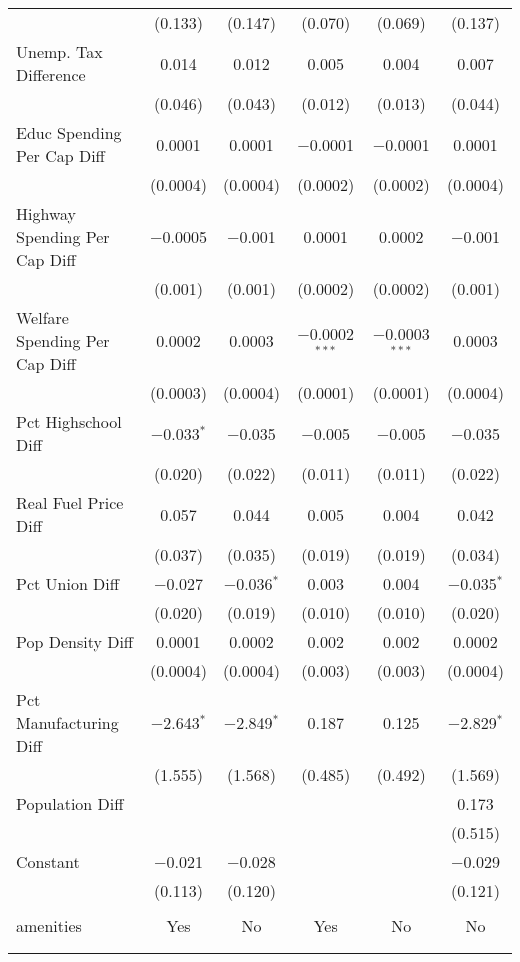 \begin{table}[!htbp]
\begin{tabular}{@{\extracolsep{5pt}}lccccc}
  & (0.133) & (0.147) & (0.070) & (0.069) & (0.137) \\ 
  Unemp. Tax Difference & 0.014 & 0.012 & 0.005 & 0.004 & 0.007 \\ 
  & (0.046) & (0.043) & (0.012) & (0.013) & (0.044) \\ 
  Educ Spending Per Cap Diff & 0.0001 & 0.0001 & $-$0.0001 & $-$0.0001 & 0.0001 \\ 
  & (0.0004) & (0.0004) & (0.0002) & (0.0002) & (0.0004) \\ 
  Highway Spending Per Cap Diff & $-$0.0005 & $-$0.001 & 0.0001 & 0.0002 & $-$0.001 \\ 
  & (0.001) & (0.001) & (0.0002) & (0.0002) & (0.001) \\ 
  Welfare Spending Per Cap Diff & 0.0002 & 0.0003 & $-$0.0002$^{***}$ & $-$0.0003$^{***}$ & 0.0003 \\ 
  & (0.0003) & (0.0004) & (0.0001) & (0.0001) & (0.0004) \\ 
  Pct Highschool Diff & $-$0.033$^{*}$ & $-$0.035 & $-$0.005 & $-$0.005 & $-$0.035 \\ 
  & (0.020) & (0.022) & (0.011) & (0.011) & (0.022) \\ 
  Real Fuel Price Diff & 0.057 & 0.044 & 0.005 & 0.004 & 0.042 \\ 
  & (0.037) & (0.035) & (0.019) & (0.019) & (0.034) \\ 
  Pct Union Diff & $-$0.027 & $-$0.036$^{*}$ & 0.003 & 0.004 & $-$0.035$^{*}$ \\ 
  & (0.020) & (0.019) & (0.010) & (0.010) & (0.020) \\ 
  Pop Density Diff & 0.0001 & 0.0002 & 0.002 & 0.002 & 0.0002 \\ 
  & (0.0004) & (0.0004) & (0.003) & (0.003) & (0.0004) \\ 
  Pct Manufacturing Diff & $-$2.643$^{*}$ & $-$2.849$^{*}$ & 0.187 & 0.125 & $-$2.829$^{*}$ \\ 
  & (1.555) & (1.568) & (0.485) & (0.492) & (1.569) \\ 
  Population Diff &  &  &  &  & 0.173 \\ 
  &  &  &  &  & (0.515) \\ 
  Constant & $-$0.021 & $-$0.028 &  &  & $-$0.029 \\ 
  & (0.113) & (0.120) &  &  & (0.121) \\ 
 \hline \\[-1.8ex] 
amenities & Yes & No & Yes & No & No \\ 
\hline \\[-1.8ex] 
\hline 
\hline \\[-1.8ex] 
\end{tabular} 
\end{table} 
